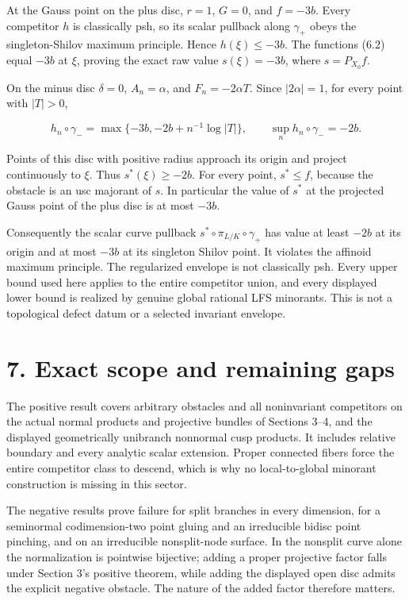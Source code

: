 \documentclass[11pt,a4paper]{article}
\begin{document}
At the Gauss point on the plus disc, \(r=1\), \(G=0\), and \(f=-3b\). Every competitor \(h\) is classically psh, so its scalar pullback along \(\gamma_+\) obeys the singleton-Shilov maximum principle. Hence \(h(\xi)\leq-3b\). The functions (6.2) equal \(-3b\) at \(\xi\), proving the exact raw value \(s(\xi)=-3b\), where \(s=P_{X_0}f\).

On the minus disc \(\delta=0\), \(A_n=\alpha\), and \(F_n=-2\alpha T\). Since \(|2\alpha|=1\), for every point with \(|T|>0\),

\[
h_n\circ\gamma_-=
\max\{-3b,-2b+n^{-1}\log|T|\},
\qquad \sup_n h_n\circ\gamma_-=-2b. \tag{6.3}
\]

Points of this disc with positive radius approach its origin and project continuously to \(\xi\). Thus \(s^*(\xi)\geq-2b\). For every point, \(s^*\leq f\), because the obstacle is an usc majorant of \(s\). In particular the value of \(s^*\) at the projected Gauss point of the plus disc is at most \(-3b\).

Consequently the scalar curve pullback \(s^*\circ\pi_{L/K}\circ\gamma_+\) has value at least \(-2b\) at its origin and at most \(-3b\) at its singleton Shilov point. It violates the affinoid maximum principle. The regularized envelope is not classically psh. Every upper bound used here applies to the entire competitor union, and every displayed lower bound is realized by genuine global rational LFS minorants. This is not a topological defect datum or a selected invariant envelope.

\section*{7. Exact scope and remaining gaps}

The positive result covers arbitrary obstacles and all noninvariant competitors on the actual normal products and projective bundles of Sections 3--4, and the displayed geometrically unibranch nonnormal cusp products. It includes relative boundary and every analytic scalar extension. Proper connected fibers force the entire competitor class to descend, which is why no local-to-global minorant construction is missing in this sector.

The negative results prove failure for split branches in every dimension, for a seminormal codimension-two point gluing and an irreducible bidisc point pinching, and on an irreducible nonsplit-node surface. In the nonsplit curve alone the normalization is pointwise bijective; adding a proper projective factor falls under Section 3's positive theorem, while adding the displayed open disc admits the explicit negative obstacle. The nature of the added factor therefore matters.
\end{document}

